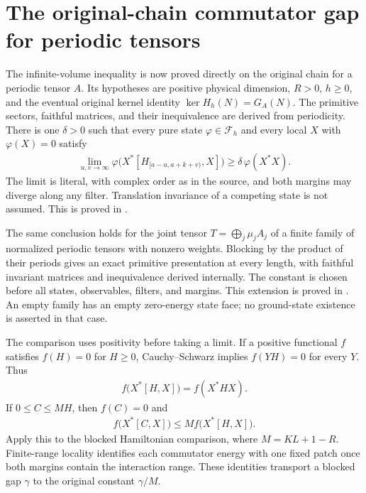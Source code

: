 \documentclass{article}
\begin{document}
\clearpage
\section{The original-chain commutator gap for periodic tensors}
The infinite-volume inequality is now proved directly on the original chain
for a periodic tensor $A$. Its hypotheses are positive physical dimension,
$R>0$, $h\geq0$, and the eventual original kernel identity
$\ker H_h(N)=G_A(N)$. The primitive sectors, faithful matrices, and their
inequivalence are derived from periodicity. There is one $\delta>0$ such
that every pure state $\varphi\in\mathcal F_h$ and every local $X$ with
$\varphi(X)=0$ satisfy
\begin{align}
 \lim_{u,v\to\infty}\varphi\bigl(X^*[H_{[a-u,a+k+v)},X]\bigr)
   \geq\delta\,\varphi(X^*X).
\end{align}
The limit is literal, with complex order as in the source, and both margins
may diverge along any filter. Translation invariance of a competing state is
not assumed. This is proved in
.

The same conclusion holds for the joint tensor
$T=\bigoplus_j\mu_jA_j$ of a finite family of normalized periodic tensors
with nonzero weights. Blocking by the product of their periods gives an
exact primitive presentation at every length, with faithful invariant
matrices and inequivalence derived internally. The constant is chosen before
all states, observables, filters, and margins. This extension is proved in
.
An empty family has an empty zero-energy state face; no ground-state existence
is asserted in that case.

The comparison uses positivity before taking a limit. If a positive
functional $f$ satisfies $f(H)=0$ for $H\geq0$, Cauchy--Schwarz implies
$f(YH)=0$ for every $Y$. Thus
\begin{align}
 f\bigl(X^*[H,X]\bigr)=f(X^*HX).
\end{align}
If $0\leq C\leq MH$, then $f(C)=0$ and
\begin{align}
 f\bigl(X^*[C,X]\bigr)\leq M f\bigl(X^*[H,X]\bigr).
\end{align}
Apply this to the blocked Hamiltonian comparison, where $M=KL+1-R$.
Finite-range locality identifies each commutator energy with one fixed
patch once both margins contain the interaction range. These identities
transport a blocked gap $\gamma$ to the original constant $\gamma/M$.
\end{document}

